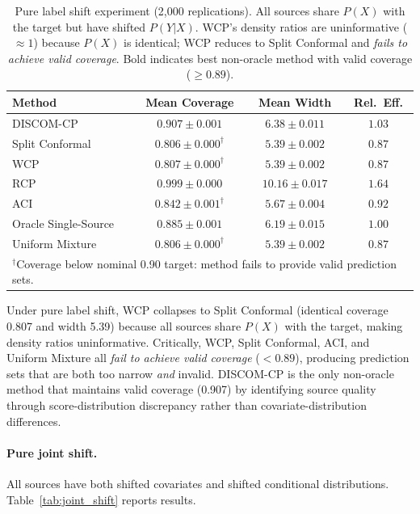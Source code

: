\documentclass{article}
\newcommand{\DISCOM}{\textsc{DISCOM-CP}}
\begin{document}
\begin{table}[t]
\caption{Pure label shift experiment (2,000 replications). All sources share $P(X)$ with the target but have shifted $P(Y|X)$. WCP's density ratios are uninformative ($\approx 1$) because $P(X)$ is identical; WCP reduces to Split Conformal and \emph{fails to achieve valid coverage}. Bold indicates best non-oracle method with valid coverage ($\geq 0.89$).}
\label{tab:label_shift}
\centering
\small
\begin{tabular}{lccc}
\toprule
\textbf{Method} & \textbf{Mean Coverage} & \textbf{Mean Width} & \textbf{Rel.\ Eff.} \\
\midrule
\DISCOM{} & $\mathbf{0.907 \pm 0.001}$ & $\mathbf{6.38 \pm 0.011}$ & $\mathbf{1.03}$ \\
Split Conformal & $0.806 \pm 0.000^\dagger$ & $5.39 \pm 0.002$ & $0.87$ \\
WCP & $0.807 \pm 0.000^\dagger$ & $5.39 \pm 0.002$ & $0.87$ \\
RCP & $0.999 \pm 0.000$ & $10.16 \pm 0.017$ & $1.64$ \\
ACI & $0.842 \pm 0.001^\dagger$ & $5.67 \pm 0.004$ & $0.92$ \\
Oracle Single-Source & $0.885 \pm 0.001$ & $6.19 \pm 0.015$ & $1.00$ \\
Uniform Mixture & $0.806 \pm 0.000^\dagger$ & $5.39 \pm 0.002$ & $0.87$ \\
\bottomrule
\multicolumn{4}{l}{\scriptsize $^\dagger$Coverage below nominal 0.90 target: method fails to provide valid prediction sets.}
\end{tabular}
\end{table}

Under pure label shift, WCP collapses to Split Conformal (identical coverage 0.807 and width 5.39) because all sources share $P(X)$ with the target, making density ratios uninformative. Critically, WCP, Split Conformal, ACI, and Uniform Mixture all \emph{fail to achieve valid coverage} ($< 0.89$), producing prediction sets that are both too narrow \emph{and} invalid. \DISCOM{} is the only non-oracle method that maintains valid coverage (0.907) by identifying source quality through score-distribution discrepancy rather than covariate-distribution differences.

\paragraph{Pure joint shift.}
All sources have both shifted covariates and shifted conditional distributions. Table~\ref{tab:joint_shift} reports results.
\end{document}
